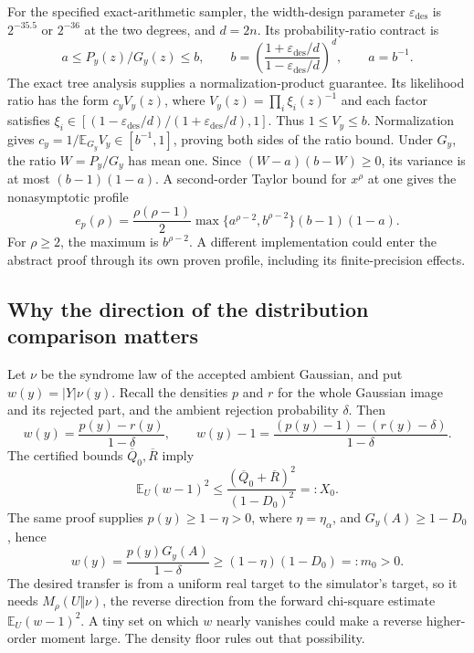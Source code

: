\documentclass[11pt,a4paper]{article}
\newcommand{\E}{\mathbb E}
\newcommand{\eps}{\varepsilon}
\theoremstyle{definition}
\theoremstyle{remark}
\numberwithin{equation}{section}
\begin{document}
For the specified exact-arithmetic sampler, the width-design parameter
$\eps_{\mathrm{des}}$ is $2^{-35.5}$ or $2^{-36}$ at the two degrees,
and $d=2n$. Its probability-ratio contract is
\begin{equation}
 a\le P_y(z)/G_y(z)\le b,\qquad
 b=\left(\frac{1+\eps_{\mathrm{des}}/d}{1-\eps_{\mathrm{des}}/d}\right)^d,
 \qquad a=b^{-1}.
 \label{eq:tree-profile}
\end{equation}
The exact tree analysis supplies a normalization-product guarantee. Its
likelihood ratio has the form $c_yV_y(z)$, where
$V_y(z)=\prod_i\xi_i(z)^{-1}$ and each factor satisfies
$\xi_i\in[(1-\eps_{\mathrm{des}}/d)/(1+\eps_{\mathrm{des}}/d),1]$.
Thus $1\le V_y\le b$. Normalization gives
$c_y=1/\E_{G_y}V_y\in[b^{-1},1]$, proving both sides of the ratio bound.
Under $G_y$, the ratio $W=P_y/G_y$ has mean one. Since
$(W-a)(b-W)\ge0$, its variance is at most $(b-1)(1-a)$. A second-order
Taylor bound for $x^\rho$ at one gives the nonasymptotic profile
\begin{equation}
 e_p(\rho)=\frac{\rho(\rho-1)}2
       \max\{a^{\rho-2},b^{\rho-2}\}(b-1)(1-a).
 \label{eq:explicit-sampler-excess}
\end{equation}
For $\rho\ge2$, the maximum is $b^{\rho-2}$. A different implementation
could enter the abstract proof through its own proven profile, including
its finite-precision effects.

\subsection{Why the direction of the distribution comparison matters}

Let $\nu$ be the syndrome law of the accepted ambient Gaussian, and put
$w(y)=|Y|\nu(y)$. Recall the densities $p$ and $r$ for the whole Gaussian
image and its rejected part, and the ambient rejection probability $\delta$.
Then
\begin{equation}
 w(y)=\frac{p(y)-r(y)}{1-\delta},\qquad
 w(y)-1=\frac{(p(y)-1)-(r(y)-\delta)}{1-\delta}.
\end{equation}
The certified bounds $\overline Q_0,\overline R$ imply
\begin{equation}
 \E_U(w-1)^2\le
 \frac{(\overline Q_0+\overline R)^2}{(1-D_0)^2}
 =:X_0.
 \label{eq:security-X0}
\end{equation}
The same proof supplies $p(y)\ge1-\eta>0$, where $\eta=\eta_\alpha$, and $G_y(A)\ge1-D_0$, hence
\begin{equation}
 w(y)=\frac{p(y)G_y(A)}{1-\delta}
       \ge(1-\eta)(1-D_0)=:m_0>0.
 \label{eq:density-floor-security}
\end{equation}
The desired transfer is from a uniform real target to the simulator's target,
so it needs $M_\rho(U\Vert\nu)$, the reverse direction from the forward
chi-square estimate $\E_U(w-1)^2$. A tiny set on which $w$ nearly vanishes
could make a reverse higher-order moment large. The density floor rules out
that possibility.
\end{document}
